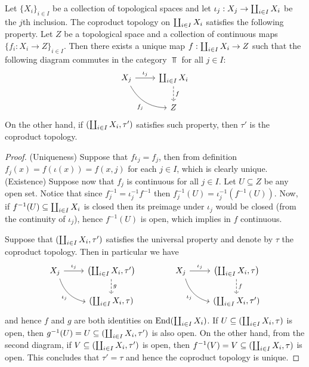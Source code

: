 \begin{theorem}
  \label{thm: coprod top universal property}
  Let \(\{X_i\}_{i \in I}\) be a collection of topological spaces and let
  \(\iota_j: X_j \to \coprod_{i \in I} X_i\) be the \(j\)th inclusion. The
  coproduct topology on \(\coprod_{i \in I} X_i\) satisfies the following
  property. Let \(Z\) be a topological space and a collection of continuous maps
  \(\{f_i: X_i \to Z\}_{i \in I}\). Then there exists a unique map \(f:
  \coprod_{i \in I} X_i \to Z\) such that the following diagram commutes in the
  category \(\Top\) for all \(j \in I\):
  \[
    \begin{tikzcd}
      X_j \ar[r, "\iota_j"]  \ar[rd, swap, bend right, "f_j"]
      & \bigatt_{i \in I} X_i \ar[d, dashed, "f"] \\ &Z
    \end{tikzcd}
  \]
  On the other hand, if \((\coprod_{i \in I} X_i, \tau')\) satisfies such
  property, then \(\tau'\) is the coproduct topology.
\end{theorem}

\begin{proof}
  (Uniqueness) Suppose that \(f  \iota_j = f_j\), then from definition
  \(f_j(x) = f(\iota(x)) = f(x, j)\) for each \(j \in I\), which is clearly
  unique.
  (Existence) Suppose now that \(f_j\) is continuous for all \(j \in I\). Let
  \(U \subseteq Z\) be any open set. Notice that since \(f_j^{-1} = \iota_j^{-1}
   f^{-1}\) then \(f_j^{-1}(U) = \iota_j^{-1}(f^{-1}(U))\). Now, if
  \(f^{-1}(U) \subseteq \coprod_{i \in I} X_i\) is closed then its preimage
  under \(\iota_j\) would be closed (from the continuity of \(\iota_j\)), hence
  \(f^{-1}(U)\) is open, which implies in \(f\) continuous.

  Suppose that \((\coprod_{i \in I} X_i, \tau')\) satisfies the universal
  property and denote by \(\tau\) the coproduct topology. Then in
  particular we have
  \[
    \begin{tikzcd}
      X_j \ar[r, "\iota_j"] \ar[rd, bend right, swap, "\iota_j"]
        &\left( \bigatt_{i \in I} X_i, \tau' \right)
        \ar[d, dashed, "g"] \\
        &(\bigatt_{i \in I} X_i, \tau)
    \end{tikzcd}
    \qquad \qquad
    \begin{tikzcd}
      X_j \ar[r, "\iota_j"] \ar[rd, bend right, swap, "\iota_j"]
        &\left( \bigatt_{i \in I} X_i, \tau \right)
        \ar[d, dashed, "f"] \\
        &(\bigatt_{i \in I} X_i, \tau')
    \end{tikzcd}
  \]
  and hence \(f\) and \(g\) are both identities on
  \(\operatorname{End}(\coprod_{i \in I} X_i)\). If
  \(U \subseteq (\coprod_{i \in I} X_i, \tau)\) is open, then
  \(g^{-1}(U) = U \subseteq (\coprod_{i \in I} X_i, \tau')\) is also open. On
  the other hand, from the second diagram, if
  \(V \subseteq (\coprod_{i \in I} X_i, \tau')\) is open, then
  \(f^{-1}(V) = V \subseteq (\coprod_{i \in I} X_i, \tau)\) is open. This
  concludes that \(\tau' = \tau\) and hence the coproduct topology is unique.
\end{proof}

